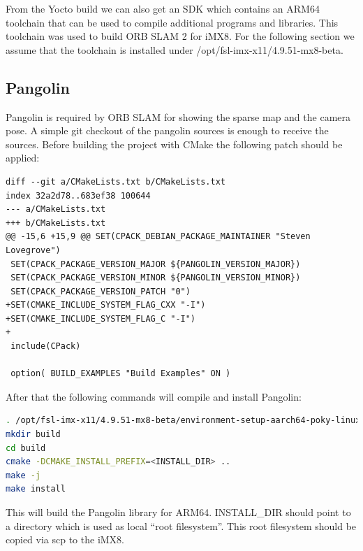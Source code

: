 \documentclass[11pt,a4paper,titlepage,oneside]{report}
\begin{document}
From the Yocto build we can also get an SDK which contains an ARM64 toolchain that can be used to compile additional programs and libraries. This toolchain was used to build ORB SLAM 2 for iMX8. For the following section we assume that the toolchain is installed under /opt/fsl-imx-x11/4.9.51-mx8-beta.

\subsection{Pangolin}
Pangolin \cite{pangolin} is required by ORB SLAM for showing the sparse map and the camera pose. A simple git checkout of the pangolin sources is enough to receive the sources. Before building the project with CMake the following patch should be applied:
\begin{lstlisting}
diff --git a/CMakeLists.txt b/CMakeLists.txt
index 32a2d78..683ef38 100644
--- a/CMakeLists.txt
+++ b/CMakeLists.txt
@@ -15,6 +15,9 @@ SET(CPACK_DEBIAN_PACKAGE_MAINTAINER "Steven Lovegrove")
 SET(CPACK_PACKAGE_VERSION_MAJOR ${PANGOLIN_VERSION_MAJOR})
 SET(CPACK_PACKAGE_VERSION_MINOR ${PANGOLIN_VERSION_MINOR})
 SET(CPACK_PACKAGE_VERSION_PATCH "0")
+SET(CMAKE_INCLUDE_SYSTEM_FLAG_CXX "-I")
+SET(CMAKE_INCLUDE_SYSTEM_FLAG_C "-I")
+
 include(CPack)
 
 option( BUILD_EXAMPLES "Build Examples" ON )
\end{lstlisting}

After that the following commands will compile and install Pangolin:
\begin{lstlisting}[language=bash]
. /opt/fsl-imx-x11/4.9.51-mx8-beta/environment-setup-aarch64-poky-linux
mkdir build
cd build
cmake -DCMAKE_INSTALL_PREFIX=<INSTALL_DIR> ..
make -j
make install
\end{lstlisting}

This will build the Pangolin library for ARM64. INSTALL\_DIR should point to a directory which is used as local ``root filesystem''. This root filesystem should be copied via scp to the iMX8.
\end{document}
